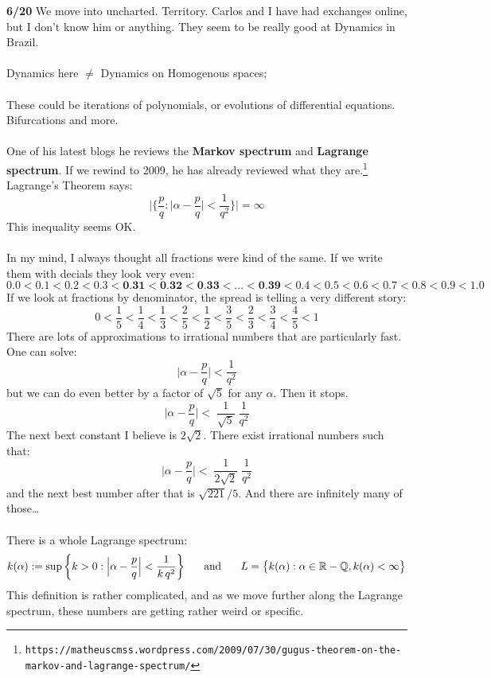 \documentclass[12pt]{article}
\begin{document}
\noindent \textbf{6/20} We move into uncharted. Territory.  Carlos and I have had exchanges online, but I don't know him or anything.  They seem to be really good at Dynamics in Brazil.  \\ \\
Dynamics here $\neq$ Dynamics on Homogenous spaces; \\ \\
These could be iterations of polynomials, or evolutions of differential equations.  Bifurcations and more. \\ \\
One of his latest blogs he reviews the \textbf{Markov spectrum} and \textbf{Lagrange spectrum}.   If we rewind to 2009, he has already reviewed what they are.\footnote{\texttt{https://matheuscmss.wordpress.com/2009/07/30/gugus-theorem-on-the-markov-and-lagrange-spectrum/}} Lagrange's Theorem says:
$$ \Big| \Big\{ \frac{p}{q}:  \big|  \alpha - \frac{p}{q} \big| < \frac{1}{q^2} \Big\} \Big| = \infty $$
This inequality seems OK. \\ \\
In my mind, I always thought all fractions were kind of the same.  If we write them with decials they look very even:
$$ 0.0 < 0.1 < 0.2 < 0.3 < \textbf{0.31} < \textbf{0.32} < \textbf{0.33} < \dots < 
\textbf{0.39} < 0.4 < 0.5 < 0.6 < 0.7 < 0.8 < 0.9 < 1.0 $$
If we look at fractions by denominator, the spread is telling a very different story:
$$  0 < \frac{1}{5} < \frac{1}{4} <   \frac{1}{3} < \frac{2}{5} <  \frac{1}{2} < \frac{3}{5} < \frac{2}{3}  < \frac{3}{4} <  \frac{4}{5} < 1  $$
There are lots of approximations to irrational numbers that are particularly fast.  One can solve:
$$ \Big|  \alpha - \frac{p}{q} \Big| < \frac{1}{q^2}  $$
but we can do even better by a factor of $\sqrt{5}$ for any $\alpha$. Then it stops. 
$$ \Big|  \alpha - \frac{p}{q} \Big| <  \;\frac{1}{\sqrt{5}}\;\frac{1}{q^2}  $$
The next bext constant I believe is $2 \sqrt{2}$.  There exist irrational numbers such that:
$$\Big|  \alpha - \frac{p}{q} \Big| <  \;\frac{1}{2\sqrt{2}}\;\frac{1}{q^2}  $$
and the next best number after that is $\sqrt{221}/5$.  And there are infinitely many of those\dots \\ \\
There is a whole Lagrange spectrum:
$$ k (\alpha) := \sup \bigg\{ k > 0 : \Big| \alpha - \frac{p}{q} \Big| < \frac{1}{k \, q^2}  \bigg\} \hspace{0.25in}\text{and}\hspace{0.25in} L = \big\{ k(\alpha): \alpha \in \mathbb{R} - \mathbb{Q}, k(\alpha) < \infty \big\}  $$
This definition is rather complicated, and as we move further along the Lagrange spectrum, these numbers are getting rather weird or specific.
\end{document}

